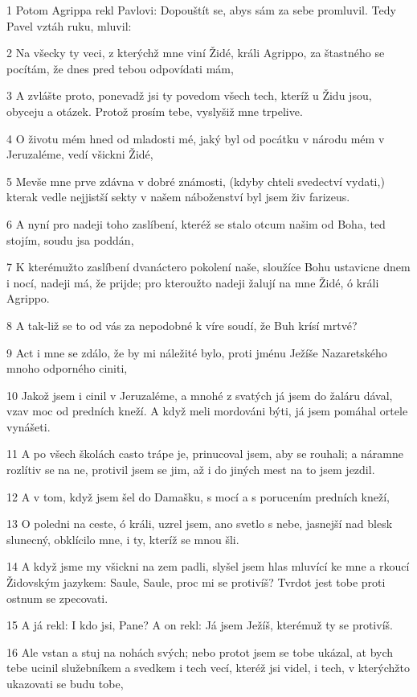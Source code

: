 \par 1 Potom Agrippa rekl Pavlovi: Dopouštít se, abys sám za sebe promluvil. Tedy Pavel vztáh ruku, mluvil:
\par 2 Na všecky ty veci, z kterýchž mne viní Židé, králi Agrippo, za štastného se pocítám, že dnes pred tebou odpovídati mám,
\par 3 A zvlášte proto, ponevadž jsi ty povedom všech tech, kteríž u Židu jsou, obyceju a otázek. Protož prosím tebe, vyslyšiž mne trpelive.
\par 4 O životu mém hned od mladosti mé, jaký byl od pocátku v národu mém v Jeruzaléme, vedí všickni Židé,
\par 5 Mevše mne prve zdávna v dobré známosti, (kdyby chteli svedectví vydati,) kterak vedle nejjistší sekty v našem náboženství byl jsem živ farizeus.
\par 6 A nyní pro nadeji toho zaslíbení, kteréž se stalo otcum našim od Boha, ted stojím, soudu jsa poddán,
\par 7 K kterémužto zaslíbení dvanáctero pokolení naše, sloužíce Bohu ustavicne dnem i nocí, nadeji má, že prijde; pro kteroužto nadeji žalují na mne Židé, ó králi Agrippo.
\par 8 A tak-liž se to od vás za nepodobné k víre soudí, že Buh krísí mrtvé?
\par 9 Act i mne se zdálo, že by mi náležité bylo, proti jménu Ježíše Nazaretského mnoho odporného ciniti,
\par 10 Jakož jsem i cinil v Jeruzaléme, a mnohé z svatých já jsem do žaláru dával, vzav moc od predních kneží. A když meli mordováni býti, já jsem pomáhal ortele vynášeti.
\par 11 A po všech školách casto trápe je, prinucoval jsem, aby se rouhali; a náramne rozlítiv se na ne, protivil jsem se jim, až i do jiných mest na to jsem jezdil.
\par 12 A v tom, když jsem šel do Damašku, s mocí a s porucením predních kneží,
\par 13 O poledni na ceste, ó králi, uzrel jsem, ano svetlo s nebe, jasnejší nad blesk slunecný, obklícilo mne, i ty, kteríž se mnou šli.
\par 14 A když jsme my všickni na zem padli, slyšel jsem hlas mluvící ke mne a rkoucí Židovským jazykem: Saule, Saule, proc mi se protivíš? Tvrdot jest tobe proti ostnum se zpecovati.
\par 15 A já rekl: I kdo jsi, Pane? A on rekl: Já jsem Ježíš, kterémuž ty se protivíš.
\par 16 Ale vstan a stuj na nohách svých; nebo protot jsem se tobe ukázal, at bych tebe ucinil služebníkem a svedkem i tech vecí, kteréž jsi videl, i tech, v kterýchžto ukazovati se budu tobe,
